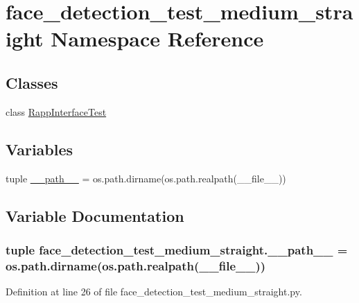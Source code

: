 \hypertarget{namespaceface__detection__test__medium__straight}{\section{face\-\_\-detection\-\_\-test\-\_\-medium\-\_\-straight Namespace Reference}
\label{namespaceface__detection__test__medium__straight}
}
\subsection*{Classes}
\begin{DoxyCompactItemize}
\item 
class \hyperlink{classface__detection__test__medium__straight_1_1RappInterfaceTest}{Rapp\-Interface\-Test}
\end{DoxyCompactItemize}
\subsection*{Variables}
\begin{DoxyCompactItemize}
\item 
tuple \hyperlink{namespaceface__detection__test__medium__straight_aa14c879440127c027b164cf00de63a2c}{\-\_\-\-\_\-path\-\_\-\-\_\-} = os.\-path.\-dirname(os.\-path.\-realpath(\-\_\-\-\_\-file\-\_\-\-\_\-))
\end{DoxyCompactItemize}


\subsection{Variable Documentation}
\hypertarget{namespaceface__detection__test__medium__straight_aa14c879440127c027b164cf00de63a2c}{
\subsubsection[{\-\_\-\-\_\-path\-\_\-\-\_\-}]{\setlength{\rightskip}{0pt plus 5cm}tuple face\-\_\-detection\-\_\-test\-\_\-medium\-\_\-straight.\-\_\-\-\_\-path\-\_\-\-\_\- = os.\-path.\-dirname(os.\-path.\-realpath(\-\_\-\-\_\-file\-\_\-\-\_\-))}}\label{namespaceface__detection__test__medium__straight_aa14c879440127c027b164cf00de63a2c}


Definition at line 26 of file face\-\_\-detection\-\_\-test\-\_\-medium\-\_\-straight.\-py.

